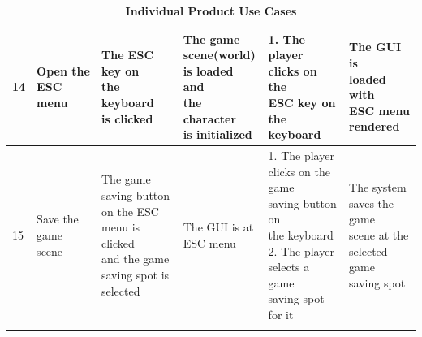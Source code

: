 \documentclass[12pt, titlepage]{article}
\begin{document}
\begin{center}
\begin{longtable}[!bpht]{|m{0.9cm}|m{2.6cm}|m{2.6cm}|m{2.7cm}|m{3.2cm}|m{2.7cm}|}
14 & \makecell[ml]{Open the ESC\\ menu} & \makecell[ml]{\hspace{-0.3mm}The \hspace{-0.5mm}ESC \hspace{-0.5mm}key \hspace{-0.5mm}on\\ the keyboard\\ is clicked} & \makecell[ml]{The game\\ scene(world)\\ is loaded and\\ the character\\ is initialized} & \makecell[ml]{1. The player\\ clicks on the\\ ESC key on the\\ keyboard} & \makecell[ml]{The GUI is\\ loaded with\\ ESC menu\\ rendered} \\\hline

15 & \makecell[ml]{Save the game\\ scene} & \makecell[ml]{The game\\ saving button\\ on the ESC\\ menu is clicked\\ and the game\\ saving spot is\\ selected} & \makecell[ml]{The GUI is at\\ ESC menu} & \makecell[ml]{1. The player\\ clicks on the game\\ saving button on\\ the keyboard\\ 2. The player\\ selects a game\\ saving spot for it} & \makecell[ml]{The system\\ saves the game\\ scene at the\\ selected game\\ saving spot}\\\hline
\caption{\bf{Individual Product Use Cases}}
\end{longtable}
\end{center}
\FloatBarrier
\end{document}
